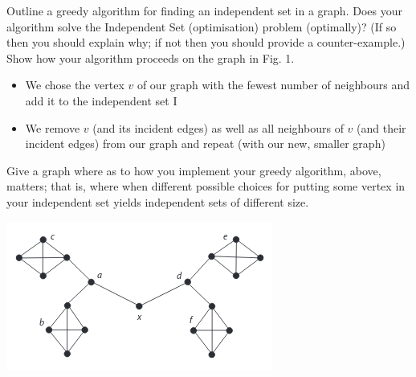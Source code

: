 \documentclass{exam}
\begin{document}
\begin{questions}
\question[10]Outline a greedy algorithm for finding an independent set in a graph.
Does your algorithm solve the Independent Set (optimisation) problem
(optimally)? (If so then you should explain why; if not then you should
provide a counter-example.) Show how your algorithm proceeds on the
graph in Fig. 1.
\begin{solution}[2in]
\begin{itemize}
	\item We chose the vertex $v$ of our graph with the fewest number of neighbours and add it to the independent set I
	\item We remove $v$ (and its incident edges) as well as all neighbours of $v$ (and their incident edges) from our graph and repeat (with our new, smaller graph)
\end{itemize}
\end{solution}
\newpage
\question[8]Give a graph where as to how you implement your greedy algorithm,
above, matters; that is, where when different possible choices for putting
some vertex in your independent set yields independent sets of different
size.
\begin{solution}[2in]
	\begin{center}
		\includegraphics[scale=0.8]{greedy_independent}
	\end{center}
\end{solution}



\end{questions}
\end{document}
